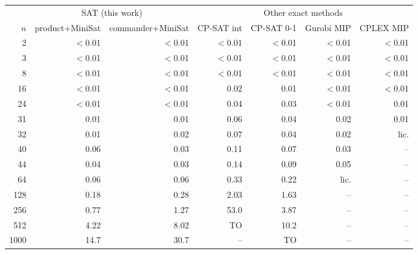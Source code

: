 \begin{tabular}{@{}rrrrrrr@{}}
\toprule
& \multicolumn{2}{c}{SAT (this work)} & \multicolumn{4}{c}{Other exact methods} \\
\cmidrule(lr){2-3}\cmidrule(lr){4-7}
$n$ & product+MiniSat & commander+MiniSat & CP-SAT int & CP-SAT 0-1 & Gurobi MIP & CPLEX MIP \\
\midrule
2 & $<$0.01 & $<$0.01 & $<$0.01 & $<$0.01 & $<$0.01 & $<$0.01 \\
3 & $<$0.01 & $<$0.01 & $<$0.01 & $<$0.01 & $<$0.01 & $<$0.01 \\
8 & $<$0.01 & $<$0.01 & $<$0.01 & $<$0.01 & $<$0.01 & $<$0.01 \\
16 & $<$0.01 & $<$0.01 & 0.02 & 0.01 & $<$0.01 & $<$0.01 \\
24 & $<$0.01 & $<$0.01 & 0.04 & 0.03 & $<$0.01 & 0.01 \\
31 & 0.01 & 0.01 & 0.06 & 0.04 & 0.02 & 0.01 \\
32 & 0.01 & 0.02 & 0.07 & 0.04 & 0.02 & lic. \\
40 & 0.06 & 0.03 & 0.11 & 0.07 & 0.03 & -- \\
44 & 0.04 & 0.03 & 0.14 & 0.09 & 0.05 & -- \\
64 & 0.06 & 0.06 & 0.33 & 0.22 & lic. & -- \\
128 & 0.18 & 0.28 & 2.03 & 1.63 & -- & -- \\
256 & 0.77 & 1.27 & 53.0 & 3.87 & -- & -- \\
512 & 4.22 & 8.02 & TO & 10.2 & -- & -- \\
1000 & 14.7 & 30.7 & -- & TO & -- & -- \\
\bottomrule
\end{tabular}

